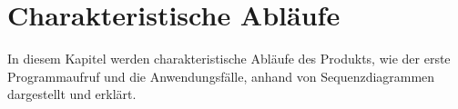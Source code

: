 \documentclass[parskip=full]{scrartcl}
\begin{document}


\section{Charakteristische Abläufe}\label{charAbl}
In diesem Kapitel werden charakteristische Abläufe des Produkts, wie der erste Programmaufruf und die
Anwendungsfälle, anhand von Sequenzdiagrammen dargestellt und erklärt.
\end{document}
